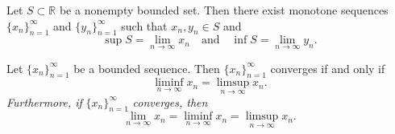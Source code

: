 \documentclass[../main.tex]{subfiles}
\begin{document}
    
    
    
    
    
    
    
    
    
    
    
    
    
    
    
    
    
    
    
    
    
    
    
    
    
    
    
    
    \begin{exercise}\label{ex: sup inf monotone sequence}
    Let \( S \subset \mathbb{R} \) be a nonempty bounded set. Then there exist monotone sequences \( \{x_n\}_{n=1}^{\infty} \) and \( \{y_n\}_{n=1}^{\infty} \) such that \( x_n, y_n \in S \) and
    \[
    \sup S = \lim_{n \to \infty} x_n \quad \text{and} \quad \inf S = \lim_{n \to \infty} y_n.
    \]
    \end{exercise}
    
    
    
    
    
    
    
    
    
    
    
    
    
    
    
    
    
    
    
    
    
    
    
    
    
    
    
    
    
    
    \begin{proposition} \label{prp: convergence criterion lim inf lim sup}
    Let \( \{x_n\}_{n=1}^{\infty} \) be a bounded sequence. Then \( \{x_n\}_{n=1}^{\infty} \) converges if and only if
    \[
    \liminf_{n \to \infty} x_n = \limsup_{n \to \infty} x_n.
    \]
    \textit{Furthermore, if} \( \{x_n\}_{n=1}^{\infty} \) \textit{converges, then}
    \[
    \lim_{n \to \infty} x_n = \liminf_{n \to \infty} x_n = \limsup_{n \to \infty} x_n.
    \]
    \end{proposition}
    
    
    
    
    
\end{document}
